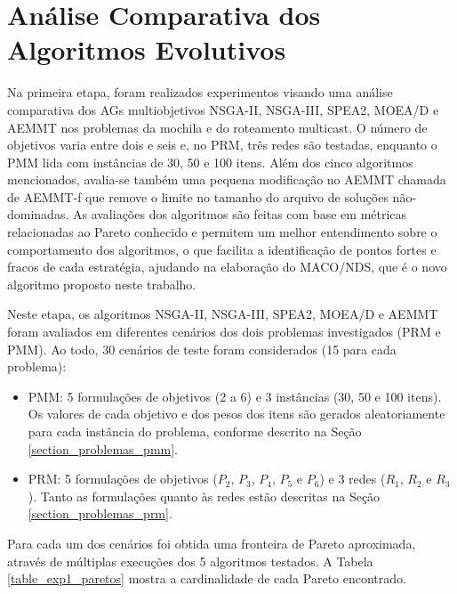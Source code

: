 \section{Análise Comparativa dos Algoritmos Evolutivos}
\label{section_experimentos_etapa1}

Na primeira etapa, foram realizados experimentos visando uma análise comparativa dos AGs multiobjetivos NSGA-II, NSGA-III, SPEA2, MOEA/D e AEMMT nos problemas da mochila e do roteamento multicast. O número de objetivos varia entre dois e seis e, no PRM, três redes são testadas, enquanto o PMM lida com instâncias de 30, 50 e 100 itens. Além dos cinco algoritmos mencionados, avalia-se também uma pequena modificação no AEMMT chamada de AEMMT-f que remove o limite no tamanho do arquivo de soluções não-dominadas. As avaliações dos algoritmos são feitas com base em métricas relacionadas ao Pareto conhecido e permitem um melhor entendimento sobre o comportamento dos algoritmos, o que facilita a identificação de pontos fortes e fracos de cada estratégia, ajudando na elaboração do MACO/NDS, que é o novo algoritmo proposto neste trabalho.

Neste etapa, os algoritmos NSGA-II, NSGA-III, SPEA2, MOEA/D e AEMMT foram avaliados em diferentes cenários dos dois problemas investigados (PRM e PMM). Ao todo, 30 cenários de teste foram considerados (15 para cada problema):

\begin{itemize}
	\item PMM: 5 formulações de objetivos (2 a 6) e 3 instâncias (30, 50 e 100 itens). Os valores de cada objetivo e dos pesos dos itens são gerados aleatoriamente para cada instância do problema, conforme descrito na Seção \ref{section_problemas_pmm}.
	\item PRM: 5 formulações de objetivos ($P_2$, $P_3$, $P_4$, $P_5$ e $P_6$) e 3 redes ($R_1$, $R_2$ e $R_3$). Tanto as formulações quanto às redes estão descritas na Seção \ref{section_problemas_prm}.
\end{itemize}

Para cada um dos cenários foi obtida uma fronteira de Pareto aproximada, através de múltiplas execuções dos 5 algoritmos testados. A Tabela \ref{table_exp1_paretos} mostra a cardinalidade de cada Pareto encontrado.

